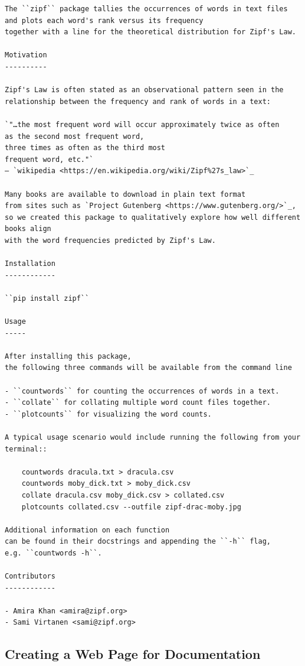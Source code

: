 \documentclass[
]{krantz}
\begin{document}
\begin{verbatim}
The ``zipf`` package tallies the occurrences of words in text files
and plots each word's rank versus its frequency
together with a line for the theoretical distribution for Zipf's Law.

Motivation
----------

Zipf's Law is often stated as an observational pattern seen in the
relationship between the frequency and rank of words in a text:

`"…the most frequent word will occur approximately twice as often
as the second most frequent word,
three times as often as the third most
frequent word, etc."`  
— `wikipedia <https://en.wikipedia.org/wiki/Zipf%27s_law>`_

Many books are available to download in plain text format
from sites such as `Project Gutenberg <https://www.gutenberg.org/>`_,
so we created this package to qualitatively explore how well different books align
with the word frequencies predicted by Zipf's Law.

Installation
------------

``pip install zipf``

Usage
-----

After installing this package,
the following three commands will be available from the command line

- ``countwords`` for counting the occurrences of words in a text.
- ``collate`` for collating multiple word count files together.
- ``plotcounts`` for visualizing the word counts.

A typical usage scenario would include running the following from your terminal::

    countwords dracula.txt > dracula.csv
    countwords moby_dick.txt > moby_dick.csv
    collate dracula.csv moby_dick.csv > collated.csv
    plotcounts collated.csv --outfile zipf-drac-moby.jpg

Additional information on each function
can be found in their docstrings and appending the ``-h`` flag,
e.g. ``countwords -h``.

Contributors
------------

- Amira Khan <amira@zipf.org>
- Sami Virtanen <sami@zipf.org>
\end{verbatim}

\hypertarget{packaging-sphinx}{%
\subsection{Creating a Web Page for Documentation}\label{packaging-sphinx}}
\end{document}
